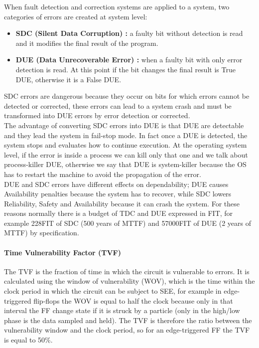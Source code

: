 {{{			
			When fault detection and correction systems are applied to a system, two categories of errors are created at system level:
			\begin{itemize}
				\item \textbf{SDC (Silent Data Corruption) :} a faulty bit without detection is read and it modifies the final result of the program.
				\item \textbf{DUE (Data Unrecoverable Error) :} when a faulty bit with only error detection is read. At this point if the bit changes the final result is True DUE, otherwise it is a False DUE.   
			\end{itemize}
			SDC errors are dangerous because they occur on bits for which errors cannot be detected or corrected, these errors can lead to a system crash and must be transformed into DUE errors by error detection or corrected. \\
			
			The advantage of converting SDC errors into DUE is that DUE are detectable  and they lead the system in fail-stop mode. In fact once a DUE is detected, the system stops and evaluates how to continue execution. At the operating system level, if the error is inside a process we can kill only that one and we talk about process-killer DUE, otherwise we say that DUE is system-killer because the OS has to restart the machine to avoid the propagation of the error.\\
			
			DUE and SDC errors have different effects on dependability; DUE causes Availability penalties because the system has to recover, while SDC lowers Reliability, Safety and Availability because it can crash the system. 
			For these reasons normally there is a budget of TDC and DUE expressed in FIT, for example  228FIT of SDC (500 years of MTTF) and 57000FIT of DUE (2 years of MTTF) by specification.   
			\paragraph{Time Vulnerability Factor (TVF)}{
				The TVF is the fraction of time in which the circuit is vulnerable to errors. It is calculated using the window of vulnerability (WOV), which is the time within the clock period in which the circuit can be subject to SEE, for example in edge-triggered flip-flops the WOV is equal to half the clock because only in that interval the FF change state if it is struck by a particle (only in the high/low phase is the data sampled and held). The TVF is therefore the ratio between the vulnerability window and the clock period, so for an edge-triggered FF the TVF is equal to 50\%. 
				
}}}}
